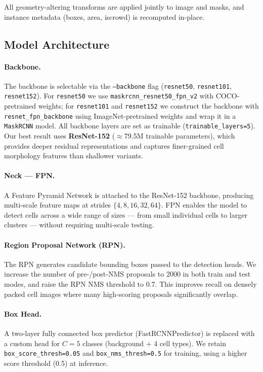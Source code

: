 \documentclass[11pt]{article}
\begin{document}
All geometry-altering transforms are applied jointly to image and masks,
and instance metadata (boxes, area, iscrowd) is recomputed in-place.

\subsection{Model Architecture}

\paragraph{Backbone.}
The backbone is selectable via the \texttt{--backbone} flag
(\texttt{resnet50}, \texttt{resnet101}, \texttt{resnet152}).
For \texttt{resnet50} we use \texttt{maskrcnn\_resnet50\_fpn\_v2} with
COCO-pretrained weights; for \texttt{resnet101} and \texttt{resnet152}
we construct the backbone with \texttt{resnet\_fpn\_backbone} using
ImageNet-pretrained weights and wrap it in a \texttt{MaskRCNN} model.
All backbone layers are set as trainable (\texttt{trainable\_layers=5}).
Our best result uses \textbf{ResNet-152} ($\approx$79.5M trainable
parameters), which provides deeper residual representations and captures
finer-grained cell morphology features than shallower variants.

\paragraph{Neck — FPN.}
A Feature Pyramid Network is attached to the ResNet-152 backbone, producing
multi-scale feature maps at strides $\{4, 8, 16, 32, 64\}$. FPN enables the
model to detect cells across a wide range of sizes — from small individual
cells to larger clusters — without requiring multi-scale testing.

\paragraph{Region Proposal Network (RPN).}
The RPN generates candidate bounding boxes passed to the detection heads.
We increase the number of pre-/post-NMS proposals to 2000 in both train
and test modes, and raise the RPN NMS threshold to 0.7. This improves
recall on densely packed cell images where many high-scoring proposals
significantly overlap.

\paragraph{Box Head.}
A two-layer fully connected box predictor (FastRCNNPredictor) is replaced
with a custom head for $C=5$ classes (background + 4 cell types).
We retain \texttt{box\_score\_thresh=0.05} and
\texttt{box\_nms\_thresh=0.5} for training, using a higher score threshold
(0.5) at inference.
\end{document}
